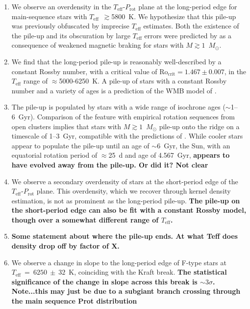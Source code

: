 \documentclass[twocolumn]{aastex631}
\newcommand{\teff}{\ensuremath{T_{\mathrm{eff}}}\xspace}
\newcommand{\prot}{\ensuremath{P_\mathrm{rot}}\xspace}
\newcommand{\msun}{$M_\odot$\xspace}
\begin{document}
\begin{enumerate}
    \item We observe an overdensity in the \teff-\prot plane at the long-period edge for main-sequence stars with \teff~$\gtrsim$5800~K. We hypothesize that this pile-up was previously obfuscated by imprecise \teff estimates. Both the existence of the pile-up and its obscuration by large \teff errors were predicted by \citet{vanSaders2019} as a consequence of weakened magnetic braking for stars with $M\gtrsim1$~\msun. 
    
    \item We find that the long-period pile-up is reasonably well-described by a constant Rossby number, with a critical value of $\mathrm{Ro_{crit}=1.467 \pm 0.007}$, in the \teff range of $\approx$5000-6250~K. A pile-up of stars with a constant Rossby number and a variety of ages is a prediction of the WMB model of \citet{vanSaders2016, vanSaders2019}.     

    \item The pile-up is populated by stars with a wide range of isochrone ages ($\sim$1--6~Gyr). Comparison of the feature with empirical rotation sequences from open clusters implies that stars with $M\gtrsim1$~\msun pile-up onto the ridge on a timescale of 1--3~Gyr, compatible with the predictions of \citet{vanSaders2019}. 
    While cooler stars appear to populate the pile-up until an age of $\sim$6~Gyr, the Sun, with an equatorial rotation period of $\approx$25~d and age of 4.567~Gyr, \textbf{appears to have evolved away from the pile-up. Or did it? Not clear}
    
    \item We observe a secondary overdensity of stars at the short-period edge of the \teff-\prot plane. This overdensity, which we recover through kernel density estimation, is not as prominent as the long-period pile-up. \textbf{The pile-up on the short-period edge can also be fit with a constant Rossby model, though over a somewhat different range of \teff. }
    
    \item \textbf{Some statement about where the pile-up ends. At what Teff does density drop off by factor of X.}
        
    

    
    \item We observe a change in slope to the long-period edge of F-type stars at $\teff~=~6250~\pm~32$~K, coinciding with the Kraft break. \textbf{The statistical significance of the change in slope across this break is $\sim 3\sigma$. Note...this may just be due to a subgiant branch crossing through the main sequence Prot distribution}
    

\end{enumerate}
\end{document}
